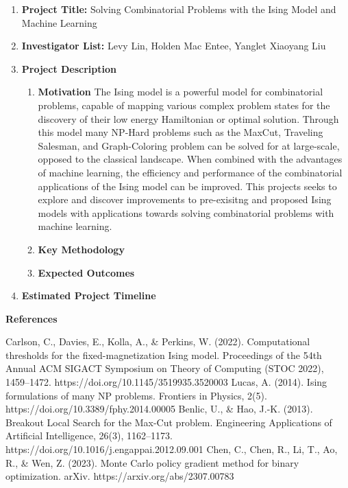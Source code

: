 \documentclass{article}
\begin{document}
\begin{enumerate}
\item \textbf{Project Title:} Solving Combinatorial Problems with the Ising Model and Machine Learning

\item \textbf{Investigator List:} Levy Lin, Holden Mac Entee, Yanglet Xiaoyang Liu

\item \textbf{Project Description}
	\begin{enumerate}
		\item \textbf{Motivation}
		\newline
		The Ising model is a powerful model for combinatorial problems, capable of mapping various complex problem states for the discovery of their low energy Hamiltonian or optimal solution. Through this model many NP-Hard problems such as the MaxCut, Traveling Salesman, and Graph-Coloring problem can be solved for at large-scale, opposed to the classical landscape. When combined with the advantages of machine learning, the efficiency and performance of the combinatorial applications of the Ising model can be improved. This projects seeks to explore and discover improvements to pre-exisitng and proposed Ising models with applications towards solving combinatorial problems with machine learning. 

		\item \textbf{Key Methodology}

		\item \textbf{Expected Outcomes}

		
	\end{enumerate}

\item \textbf{Estimated Project Timeline}
\end{enumerate}

\textbf{References}
\begin{thebibliography}{00}
Carlson, C., Davies, E., Kolla, A., \& Perkins, W. (2022). Computational thresholds for the fixed-magnetization Ising model. Proceedings of the 54th Annual ACM SIGACT Symposium on Theory of Computing (STOC 2022), 1459–1472. https://doi.org/10.1145/3519935.3520003
Lucas, A. (2014). Ising formulations of many NP problems. Frontiers in Physics, 2(5). https://doi.org/10.3389/fphy.2014.00005
Benlic, U., \& Hao, J.-K. (2013). Breakout Local Search for the Max-Cut problem. Engineering Applications of Artificial Intelligence, 26(3), 1162–1173. https://doi.org/10.1016/j.engappai.2012.09.001
Chen, C., Chen, R., Li, T., Ao, R., \& Wen, Z. (2023). Monte Carlo policy gradient method for binary optimization. arXiv. https://arxiv.org/abs/2307.00783


\end{thebibliography}
\end{document}
